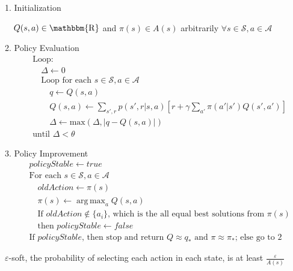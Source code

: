 \documentclass[lang=en,mode=geye,device=normal,color=blue,14pt]{elegantnote}
\DeclareMathOperator*{\1}{\mathbbm{1}}
\DeclareMathOperator*{\R}{\mathbbm{R}}
\DeclareMathOperator*{\argmax}{arg\,max}
\begin{document}
\begin{tcolorbox}[width=\textwidth,title={Policy Iteration (using iterative policy evaluation) for estimating $\pi \approx \pi_*$}]
1. Initialization

$\quad Q(s,a) \in\R$ and $\pi(s) \in A(s)$ arbitrarily $\forall s \in \mathcal{S}, a \in \mathcal{A}$

2. Policy Evaluation
\begin{align*}
&\text{Loop:}\\
&\quad\Delta \leftarrow 0\\
&\quad\text{Loop for each } s \in \mathcal{S}, a \in \mathcal{A}\\
&\quad\quad q \leftarrow Q(s,a)\\
&\quad\quad Q(s,a) \leftarrow \sum_{s',r} p(s',r|s,a)[r + \gamma \sum_{a'}\pi(a'|s')Q(s',a')]\\
&\quad\quad \Delta \leftarrow \text{max}(\Delta, |q-Q(s,a)|)\\
&\text{until } \Delta < \theta
\end{align*}

3. Policy Improvement
\begin{align*}
&policyStable \leftarrow true\\
&\text{For each } s \in \mathcal{S}, a \in \mathcal{A}\\
&\quad oldAction \leftarrow \pi(s)\\
&\quad \pi(s) \leftarrow \argmax_a Q(s,a)\\
&\quad \text{If } oldAction \notin \{a_i\} \text{, which is the all equal best solutions from $\pi(s)$}\\
& \quad \text{then } policyStable \leftarrow false\\
&\text{If } policyStable \text{, then stop and return } Q \approx q_* \text{ and } \pi \approx \pi_*\text{; else go to 2}	
\end{align*}
\end{tcolorbox}


\begin{definition}
$\varepsilon$-soft, the probability of selecting each action in each state, is at least $\frac{\varepsilon}{A(s)}$
\end{definition}
\end{document}
